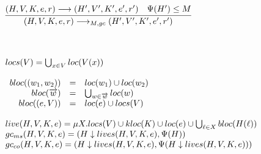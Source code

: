 \documentclass[fleqn]{article}
\begin{document}
\[\begin{array}{l}
	\infer{(H,V,K,e,r) \longrightarrow_{M,gc} (H',V',K',e',r')}{(H,V,K,e,r) \longrightarrow (H',V',K',e',r') & \Psi(H') \le M} \\
	\\
	\\
	\\
	locs(V) = \bigcup_{x\in V} loc(V(x)) \\
	\\
	\begin{array}{rcl}
		bloc((w_1,w_2)) & = & loc(w_1) \cup loc(w_2) \\
		bloc(\overrightarrow{w}) & = & \bigcup_{w \in \overrightarrow{w}} loc(w) \\
		bloc((e,V)) & = & loc(e) \cup locs(V)
	\end{array} \\
	\\
	live(H,V,K,e) = \mu X. locs(V) \cup kloc(K) \cup loc(e) \cup \bigcup_{\ell \in X} bloc(H(\ell))  \\
	gc_{ms}(H,V,K,e) = (H \downarrow lives(H,V,K,e), \Psi(H)) \\
	gc_{co}(H,V,K,e) = (H \downarrow lives(H,V,K,e), \Psi(H \downarrow lives(H,V,K,e)))
\end{array}
\]
\end{document}
